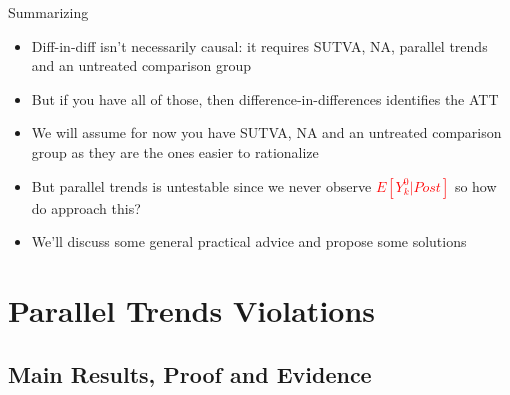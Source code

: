 \documentclass{beamer}
\begin{document}
  



\begin{frame}{Summarizing}

\begin{itemize}
\item Diff-in-diff isn't necessarily causal: it requires SUTVA, NA, parallel trends and an untreated comparison group
\item But if you have all of those, then difference-in-differences identifies the ATT
\item We will assume for now you have SUTVA, NA and an untreated comparison group as they are the ones easier to rationalize
\item But parallel trends is untestable since we never observe \textcolor{red}{$E[Y^0_k|Post]$} so how do approach this?
\item We'll discuss some general practical advice and propose some solutions
\end{itemize}

\end{frame}



\section{Parallel Trends Violations}

\subsection{Main Results, Proof and Evidence}
\end{document}

